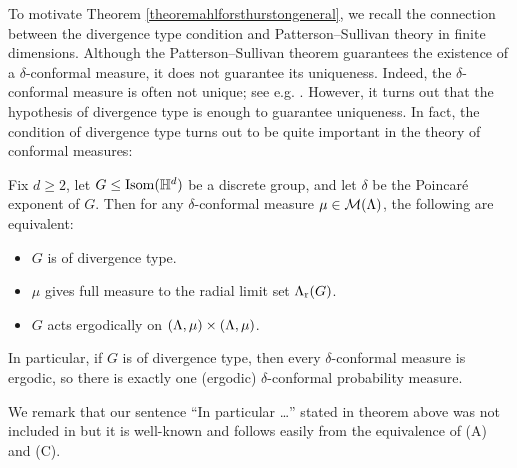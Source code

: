 
To motivate Theorem \ref{theoremahlforsthurstongeneral}, we recall the connection between the divergence type condition and Patterson--Sullivan theory in finite dimensions. Although the Patterson--Sullivan theorem guarantees the existence of a $\delta$-conformal measure, it does not guarantee its uniqueness. Indeed, the $\delta$-conformal measure is often not unique; see e.g. \cite{AFT}. However, it turns out that the hypothesis of divergence type is enough to guarantee uniqueness. In fact, the condition of divergence type turns out to be quite important in the theory of conformal measures:

\begin{theorem}
\label{theoremahlforsthurston}
Fix $d\geq 2$, let $G\leq\Isom(\H^d)$ be a discrete group, and let $\delta$ be the Poincar\'e exponent of $G$. Then for any $\delta$-conformal measure $\mu\in\mathcal M(\Lambda)$, the following are equivalent:
\begin{itemize}
\item[(A)] $G$ is of divergence type.
\item[(B)] $\mu$ gives full measure to the radial limit set $\Lambda_{\mathrm r}(G)$.
\item[(C)] $G$ acts ergodically on $(\Lambda,\mu)\times (\Lambda,\mu)$.
\end{itemize}
In particular, if $G$ is of divergence type, then every $\delta$-conformal measure is ergodic, so there is exactly one (ergodic) $\delta$-conformal probability measure.
\end{theorem}
We remark that our sentence ``In particular \ldots'' stated in theorem above was not included in \cite[Theorem 8.3.5]{Nicholls} but it is well-known and follows easily from the equivalence of (A) and (C).

